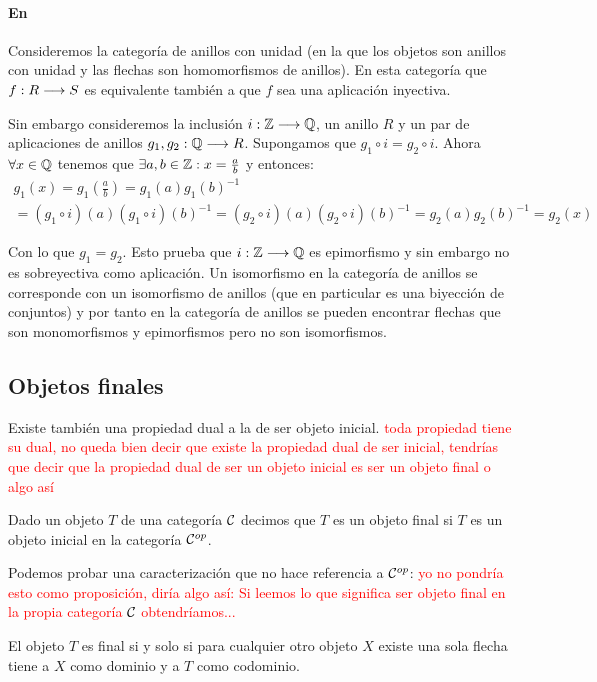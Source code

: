 \paragraph{En \Ring}
Consideremos la categoría de anillos con unidad (en la
que los objetos son anillos con unidad y
las flechas son homomorfismos de anillos). En esta categoría
que $f : R\longrightarrow S$ es equivalente también a que $f$ sea una aplicación
inyectiva.

Sin embargo consideremos la inclusión
$i : \mathbb{Z}\longrightarrow \mathbb{Q}$, un anillo $R$
y un par de aplicaciones de anillos $g_1, g_2 : \mathbb{Q}\longrightarrow R$. Supongamos
que $g_1 \circ i = g_2 \circ i$. Ahora  $\forall x \in \mathbb{Q}$
tenemos que $\exists a, b \in \mathbb{Z} : x = \frac{a}{b}$ y entonces:
\begin{multline*}
g_1(x) = g_1(\frac{a}{b}) = g_1(a)g_1(b)^{-1} \\
       = (g_1 \circ i)(a)(g_1\circ i)(b)^{-1}
       = (g_2\circ i)(a)(g_2\circ i)(b)^{-1}
       = g_2(a)g_2(b)^{-1} = g_2(x)
\end{multline*}

Con lo que $g_1=g_2$. Esto prueba que $i : \mathbb{Z}\longrightarrow \mathbb{Q}$ es epimorfismo
y sin embargo no es sobreyectiva como aplicación. Un isomorfismo en
la categoría de anillos se corresponde con un isomorfismo de anillos
(que en particular es una biyección de conjuntos) y por tanto
en la categoría de anillos se pueden encontrar flechas que son
monomorfismos y epimorfismos pero no son isomorfismos.

\subsection{Objetos finales}
Existe también una propiedad dual a la de ser objeto inicial. \textcolor{red}{toda propiedad tiene su dual, no queda bien decir que existe la propiedad dual de ser inicial, tendrías que decir que la propiedad dual de ser un objeto inicial es ser un objeto final o algo así}

\begin{definition}
Dado un objeto $T$ de una categoría $\mathcal{C}$ decimos que
$T$ es un objeto final si $T$ es un objeto inicial en la
categoría $\mathcal{C}^{op}$.
\end{definition}

Podemos probar una caracterización que no hace referencia a
$\mathcal{C}^{op}$: \textcolor{red}{yo no pondría esto como proposición, diría algo así: Si leemos lo que significa ser objeto final en la propia categoría $\mathcal{C}$ obtendríamos...}

\begin{proposition}
El objeto $T$ es final si y solo si para cualquier otro objeto
$X$ existe una sola flecha tiene a $X$ como dominio y a $T$ como
codominio.
\end{proposition}

